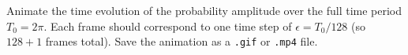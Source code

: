 \begin{solution}
\end{solution}

\begin{problem}[10]
Animate the time evolution of the probability amplitude over the full time period $T_0 = 2\pi$.
Each frame should correspond to one time step of $\epsilon = T_0/128$ (so $128+1$ frames total).
Save the animation as a \texttt{.gif} or \texttt{.mp4} file.
\end{problem}

\begin{solution}
\end{solution}


